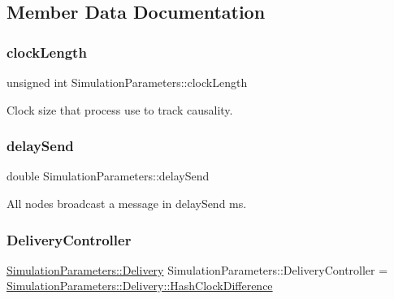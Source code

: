 \subsection{Member Data Documentation}
\mbox{\label{class_simulation_parameters_a34b25081ba9b20aa461c03ab3ade034b}} 
\subsubsection{\texorpdfstring{clock\+Length}{clockLength}}
{\footnotesize\ttfamily unsigned int Simulation\+Parameters\+::clock\+Length}



Clock size that process use to track causality. 

\mbox{\label{class_simulation_parameters_ae02521fdf6d81eff5e620a6a021106d3}} 
\subsubsection{\texorpdfstring{delay\+Send}{delaySend}}
{\footnotesize\ttfamily double Simulation\+Parameters\+::delay\+Send}



All nodes broadcast a message in delay\+Send ms. 

\mbox{\label{class_simulation_parameters_ab379e91439dd9d4179096d30f930d459}} 
\subsubsection{\texorpdfstring{Delivery\+Controller}{DeliveryController}}
{\footnotesize\ttfamily \hyperlink{class_simulation_parameters_ae08444273809241f502aa422205f7307}{Simulation\+Parameters\+::\+Delivery} Simulation\+Parameters\+::\+Delivery\+Controller = \hyperlink{class_simulation_parameters_ae08444273809241f502aa422205f7307a9a46ad9fb926b8b78ba9395f96aa6af0}{Simulation\+Parameters\+::\+Delivery\+::\+Hash\+Clock\+Difference}\hspace{0.3cm}{\ttfamily [static]}}



